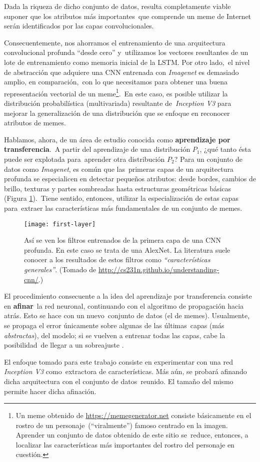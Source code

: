 Dada la riqueza de dicho conjunto de datos, resulta completamente viable suponer que los atributos más importantes\
que comprende un meme de Internet serán identificados por las capas convolucionales.\par
Consecuentemente, nos ahorramos el entrenamiento de una arquitectura convolucional profunda ``desde cero'' y\
utilizamos los vectores resultantes de un lote de entrenamiento como memoria inicial de la LSTM. Por otro lado,\
el nivel de abstracción que adquiere una CNN entrenada con \emph{Imagenet} es demasiado amplio, en comparación,\
con lo que necesitamos para obtener una buena representación vectorial de un meme\footnote{
  Un meme obtenido de \url{https://memegenerator.net} consiste básicamente en el rostro de un personaje\
  (``viralmente'') famoso centrado en la imagen. Aprender un conjunto de datos obtenido de este sitio se\
  reduce, entonces, a localizar las características más importantes del rostro del personaje en cuestión.
}.\
En este caso, es posible utilizar la distribución probabilística (multivariada) resultante de\
\emph{Inception V3} para mejorar la generalización de una distribución que se enfoque en reconocer atributos de memes.\par
Hablamos, ahora, de un área de estudio conocida como \textbf{aprendizaje por transferencia}.\
A partir del aprendizaje de una distribución $P_1$, ¿qué tanto ésta puede ser explotada para\
aprender otra distribución $P_2$? Para un conjunto de datos como \emph{Imagenet}, es común que las\
primeras capas de un arquitectura profunda se especialicen en detectar pequeños atributos: desde bordes,
cambios de brillo, texturas y partes sombreadas hasta estructuras geométricas básicas (Figura \ref{first-layer}).\
Tiene sentido, entonces, utilizar la especialización de estas capas para\
extraer las características más fundamentales de un conjunto de memes.

\begin{figure}[H]
  \centering
  \texttt{[image: first-layer]}
  \caption{
    Así se ven los filtros entrenados de la primera capa de una CNN profunda.
    En este caso se trata de una AlexNet. La literatura suele conocer a los resultados de estos
    filtros como \emph{``características generales''}.
    (Tomado de \url{http://cs231n.github.io/understanding-cnn/}.)}
  \label{first-layer}
\end{figure}

El procedimiento consecuente a la idea del aprendizaje por transferencia consiste en \textbf{afinar}\
la red neuronal, continuando con el algoritmo de propagación hacia atrás. Esto se hace con un nuevo\
conjunto de datos (el de memes). Usualmente, se propaga el error únicamente sobre algunas de las últimas\
capas (más \emph{abstractas}), del modelo; si se vuelven a entrenar todas las capas, cabe la posibilidad\
de llegar a un sobreajuste \cite{DBLP:journals/corr/YosinskiCBL14}.\par
El enfoque tomado para este trabajo consiste en experimentar con una red \emph{Inception V3} como\
extractora de características. Más aún, se probará afinando dicha arquitectura con el conjunto de datos\
reunido. El tamaño del mismo permite hacer dicha afinación.

